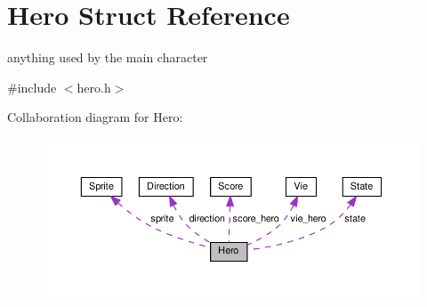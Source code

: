 \hypertarget{structHero}{}\section{Hero Struct Reference}
\label{structHero}


anything used by the main character  




{\ttfamily \#include $<$hero.\+h$>$}



Collaboration diagram for Hero\+:
\nopagebreak
\begin{figure}[H]
\begin{center}
\leavevmode
\includegraphics[width=350pt]{structHero__coll__graph}
\end{center}
\end{figure}

